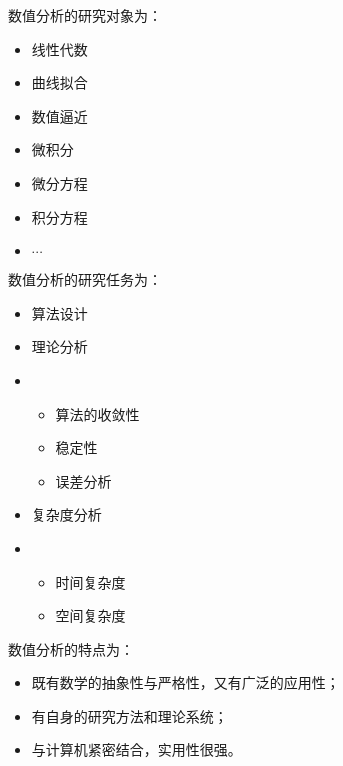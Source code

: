 %
%
%
\begin{frame}\ft{\secname}%
数值分析的研究对象为： 
\begin{itemize}
\item
线性代数\\
\item
曲线拟合\\
\item
数值逼近\\
\item
微积分\\
\item
微分方程\\
\item
积分方程\\
\item
$\cdots$
\end{itemize}
\end{frame}

\begin{frame}\ft{\secname}%
数值分析的研究任务为： 
\begin{itemize}
\item
算法设计 
\item
理论分析
\item[]
\begin{itemize}
\item 算法的收敛性 
\item 稳定性 
\item 误差分析
\end{itemize} 

\item
复杂度分析
\item[]
\begin{itemize}
\item 时间复杂度 
\item 空间复杂度
\end{itemize} 
\end{itemize}

\end{frame}
%
\begin{frame}\ft{\secname}%
数值分析的特点为： 
\begin{itemize}
\item
既有数学的抽象性与严格性，又有广泛的应用性；
\item
有自身的研究方法和理论系统；
\item
与计算机紧密结合，实用性很强。
\end{itemize}

\end{frame}
